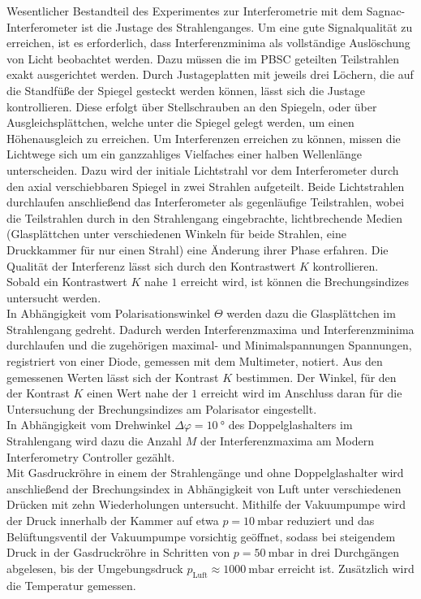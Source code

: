 \label{durchfuehrung}
\noindent Wesentlicher Bestandteil des Experimentes zur Interferometrie mit dem
Sagnac-Interferometer ist die Justage des Strahlenganges. Um eine gute
Signalqualität zu erreichen, ist es erforderlich, dass Interferenzminima als
vollständige Auslöschung von Licht beobachtet werden. Dazu müssen die im PBSC
geteilten Teilstrahlen exakt ausgerichtet werden. Durch Justageplatten mit
jeweils drei Löchern, die auf die Standfüße der Spiegel gesteckt werden können,
lässt sich die Justage kontrollieren. Diese erfolgt über Stellschrauben an den
Spiegeln, oder über Ausgleichsplättchen, welche unter die Spiegel gelegt werden,
um einen Höhenausgleich zu erreichen. Um Interferenzen erreichen zu können,
missen die Lichtwege sich um ein ganzzahliges Vielfaches einer halben Wellenlänge
unterscheiden. Dazu wird der initiale Lichtstrahl vor dem Interferometer durch
den axial verschiebbaren Spiegel in zwei Strahlen aufgeteilt. Beide Lichtstrahlen
durchlaufen anschließend das Interferometer als gegenläufige Teilstrahlen, wobei
die Teilstrahlen durch in den Strahlengang eingebrachte, lichtbrechende Medien
(Glasplättchen unter verschiedenen Winkeln für beide Strahlen, eine Druckkammer
für nur einen Strahl) eine Änderung ihrer Phase erfahren. Die Qualität der
Interferenz lässt sich durch den Kontrastwert $K$ kontrollieren. Sobald ein
Kontrastwert $K$ nahe $1$ erreicht wird, ist können die Brechungsindizes
untersucht werden. \\
\noindent In Abhängigkeit vom Polarisationswinkel $\Theta$ werden dazu die
Glasplättchen im Strahlengang gedreht. Dadurch werden Interferenzmaxima und
Interferenzminima durchlaufen und die zugehörigen maximal- und Minimalspannungen
Spannungen, registriert von einer Diode, gemessen mit dem Multimeter, notiert.
Aus den gemessenen Werten lässt sich der Kontrast $K$ bestimmen. Der Winkel, für
den der Kontrast $K$ einen Wert nahe der $1$ erreicht wird im Anschluss daran für
die Untersuchung der Brechungsindizes am Polarisator eingestellt. \\
\noindent In Abhängigkeit vom Drehwinkel $\Delta \varphi = \SI{10}{\degree}$ des
Doppelglashalters im Strahlengang wird dazu die Anzahl $M$ der Interferenzmaxima
am Modern Interferometry Controller gezählt.  \\
\noindent Mit Gasdruckröhre in einem der Strahlengänge und ohne Doppelglashalter
wird anschließend der Brechungsindex in Abhängigkeit von Luft unter verschiedenen
Drücken mit zehn Wiederholungen untersucht. Mithilfe der Vakuumpumpe wird der Druck innerhalb der
Kammer auf etwa $p = \num{10} \: \text{mbar}$ reduziert und das Belüftungsventil der
Vakuumpumpe vorsichtig geöffnet, sodass bei steigendem Druck in der Gasdruckröhre
in Schritten von $p = \num{50} \: \text{mbar}$ in drei Durchgängen abgelesen, bis
der Umgebungsdruck $p_\text{Luft} \approx \num{1000} \: \text{mbar}$ erreicht ist.
Zusätzlich wird die Temperatur gemessen.
